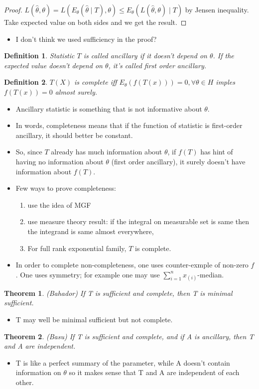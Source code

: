 \documentclass[11pt,reqno]{amsart}
\newtheorem{theorem}{Theorem}
\newtheorem{definition}{Definition}
\theoremstyle{remark}
\begin{document}
\begin{proof}
$L(\hat\theta,\theta)=L(E_\theta(\hat\theta\mid T),\theta)\leq E_\theta(L(\hat\theta,\theta)\mid T)$ by Jensen inequality. Take expected value on both sides and we get the result.
\end{proof}
\begin{itemize}
\item I don't think we used sufficiency in the proof?
\end{itemize}
\begin{definition}
Statistic $T$ is called ancillary if it doesn't depend on $\theta$. If the expected value doesn't depend on $\theta$, it's called first order ancillary.
\end{definition}
\begin{definition}
$T(X)$ is complete iff $E_\theta(f(T(x)))=0,\forall\theta\in H$ imples $f(T(x))=0$ almost surely. 
\end{definition}
\begin{itemize}
\item Ancillary statistic is something that is not informative about $\theta$.
\item In words, completeness means that if the function of statistic is first-order ancillary, it should better be constant.
\item So, since $T$ already has much information about $\theta$, if $f(T)$ has hint of having no information about $\theta$ (first order ancillary), it surely doesn't 
have information about $f(T)$.
\item Few ways to prove completeness: 
\begin{enumerate}
\item use the idea of MGF
\item use measure theory result: if the integral on measurable set is same then the integrand is same almost everywhere,
\item For full rank exponential family, $T$ is complete. 
\end{enumerate}
\item In order to complete non-completeness, one uses counter-exmple of non-zero $f$. One uses symmetry; for example 
one may use $\sum_{i=1}^n x_{(i)}$-median.
\end{itemize}
\begin{theorem}(Bahador)
If T is sufficient and complete, then T is minimal sufficient.
\end{theorem}
\begin{itemize}
\item T may well be minimal sufficient but not complete. 
\end{itemize}
\begin{theorem}(Basu)
If T is sufficient and complete, and if A is ancillary, then T and A are independent.
\end{theorem}
\begin{itemize}
\item T is like a perfect summary of the parameter, while A doesn't contain information on $\theta$ so it makes sense
that T and A are independent of each other.
\end{itemize}
\end{document}
